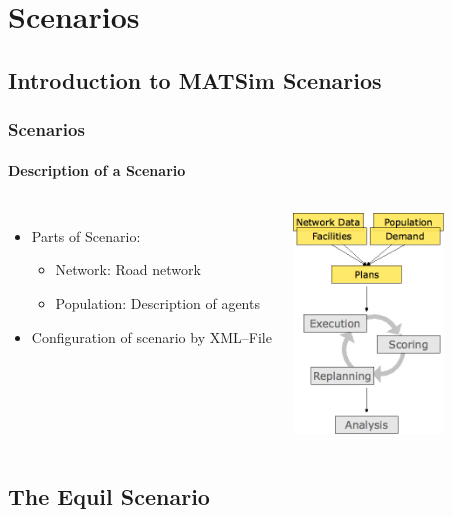 \section{Scenarios}

\subsection{Introduction to MATSim Scenarios}

\begin{frame}
\frametitle{Scenarios}
\framesubtitle{Description of a Scenario}
\begin{columns}[T]

\column{7cm}

\begin{itemize}
  \item Parts of Scenario:
  \begin{itemize}
    \item Network: Road network
	\item Population: Description of agents
  \end{itemize}
  \item Configuration of scenario by XML--File
\end{itemize}

\column{5cm}
\includegraphics[width=4cm]{../graphics/overviewMatsimDemand.png}

\end{columns}

\end{frame}

\subsection{The Equil Scenario}


